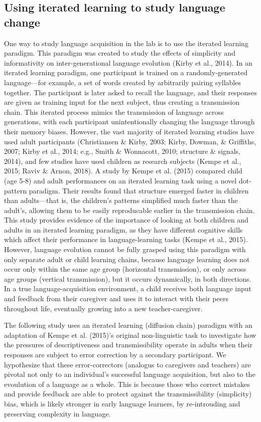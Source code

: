 \documentclass[10pt, letterpaper]{article}
\begin{document}
\subsection{Using iterated learning to study language
change}\label{using-iterated-learning-to-study-language-change}

One way to study language acquisition in the lab is to use the iterated
learning paradigm. This paradigm was created to study the effects of
simplicity and informativity on inter-generational language evolution
(Kirby et al., 2014). In an iterated learning paradigm, one participant
is trained on a randomly-generated language---for example, a set of
words created by arbitrarily pairing syllables together. The participant
is later asked to recall the language, and their responses are given as
training input for the next subject, thus creating a transmission chain.
This iterated process mimics the transmission of language across
generations, with each participant unintentionally changing the language
through their memory biases. However, the vast majority of iterated
learning studies have used adult participants (Christiansen \& Kirby,
2003; Kirby, Dowman, \& Griffiths, 2007; Kirby et al., 2014; e.g., Smith
\& Wonnacott, 2010; structure \& signals, 2014), and few studies have
used children as research subjects (Kempe et al., 2015; Raviv \& Arnon,
2018). A study by Kempe et al. (2015) compared child (age 5-8) and adult
performances on an iterated learning task using a novel dot-pattern
paradigm. Their results found that structure emerged faster in children
than adults---that is, the children's patterns simplified much faster
than the adult's, allowing them to be easily reproducable earlier in the
transmission chain. This study provides evidence of the importance of
looking at both children and adults in an iterated learning paradigm, as
they have different cognitive skills which affect their performance in
language-learning tasks (Kempe et al., 2015). However, language
evolution cannot be fully grasped using this paradigm with only separate
adult or child learning chains, because language learning does not occur
only within the same age group (horizontal transmission), or only across
age groups (vertical transmission), but it occurs dynamically, in both
directions. In a true language-acquisition environment, a child receives
both language input and feedback from their caregiver and uses it to
interact with their peers throughout life, eventually growing into a new
teacher-caregiver.

The following study uses an iterated learning (diffusion chain) paradigm
with an adaptation of Kempe et al. (2015)'s original non-linguistic task
to investigate how the pressures of descriptiveness and transmissibility
operate in adults when their responses are subject to error correction
by a secondary participant. We hypothesize that these error-correctors
(analogus to caregivers and teachers) are pivotal not only to an
individual's successful language acquisition, but also to the evoulution
of a language as a whole. This is because those who correct mistakes and
provide feedback are able to protect against the transmissibility
(simplicity) bias, which is likely stronger in early language learners,
by re-introuding and preserving complexity in language.
\end{document}

